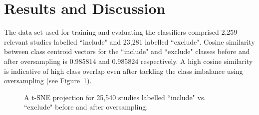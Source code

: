 \documentclass{IOS-Book-Article}
\begin{document}
\section{Results and Discussion}
%
The data set used for training and evaluating the classifiers comprised 2,259 relevant studies labelled ``include" and 23,281 labelled ``exclude".
Cosine similarity between class centroid vectors for the ``include" and ``exclude" classes before and after oversampling is 0.985814 and 0.985824 respectively.
A high cosine similarity is indicative of high class overlap even after tackling the class imbalance using oversampling (see Figure~\ref{fig:tsne}).
%
\begin{figure}%
    \centering
    \qquad
    \caption{A t-SNE projection for 25,540 studies labelled ``include" vs. ``exclude" before and after oversampling.}%
    \label{fig:tsne}
\end{figure}
\end{document}
